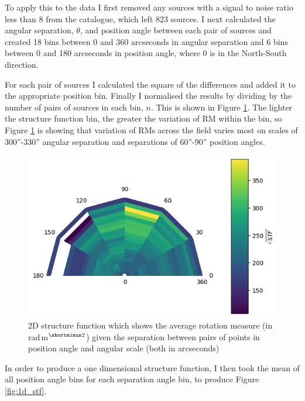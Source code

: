 To apply this to the data I first removed any sources with a signal to noise ratio less than 8 from the catalogue, which left 823 sources. I next calculated the angular separation, $\theta$, and position angle between each pair of sources and created 18 bins between 0 and 360 arcseconds in angular separation and 6 bins between 0 and 180 arcseconds in position angle, where 0 is in the North-South direction. 

For each pair of sources I calculated the square of the differences and added it to the appropriate position bin. Finally I normalised the results by dividing by the number of pairs of sources in each bin, $n$. This is shown in Figure \ref{fig:2d_stf}. The lighter the structure function bin, the greater the variation of RM within the bin, so Figure \ref{fig:2d_stf} is showing that variation of RMs across the field varies most on scales of 300''-330'' angular separation and separations of 60''-90'' position angles.



\begin{figure}
        \centering
        \includegraphics[width=\linewidth]{Thesis_Template/Figures/2D_STF.png}
        \caption[2D Structure Function]{2D structure function which shows the average rotation measure (in rad$\,$m$^{\shortminus2}$) given the separation between pairs of points in position angle and angular scale (both in arcseconds)}
        \label{fig:2d_stf}
    \end{figure}

In order to produce a one dimensional structure function, I then took the mean of all position angle bins for each separation angle bin, to produce Figure \ref{fig:1d_stf}.



